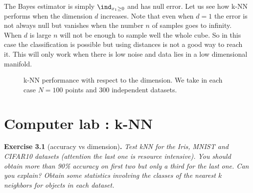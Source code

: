 The Bayes estimator is simply $\ind_{x_1 \geq 0}$ and has null error. Let us see how
k-NN performs when the dimension $d$ increases. Note that even when $d = 1$
the error is not always null but vanishes when the number $n$ of samples goes to
infinity. When $d$ is large $n$ will not be enough to sample well the whole cube.
So in this case the classification is possible but using distances is not a good
way to reach it. This will only work when there is low noise and data lies in a
low dimensional manifold.

\begin{figure}[h]\centering
\caption{k-NN performance with respect to the dimension. We take in each
case $N = 100$ points and $300$ independent datasets.}\label{fig:ch3-curse-dim}
\end{figure}

\section{Computer lab : k-NN}
\label{sec:ch3-computer-lab}

\begin{tcolorbox}[remarkbox]
\textbf{Exercise 3.1} (accuracy vs dimension)\textbf{.} \textit{Test kNN for the Iris, MNIST
and CIFAR10 datasets (attention the last one is resource intensive).
You should obtain more than 90\% accuracy on first two but only a third
for the last one. Can you explain? Obtain some statistics involving the
classes of the nearest $k$ neighbors for objects in each dataset.}
\end{tcolorbox}

